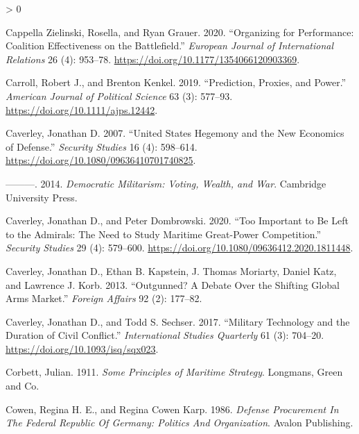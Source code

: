 \documentclass[
]{article}
\newlength{\cslhangindent}
\newenvironment{CSLReferences}[2] %
 {%
  \setlength{\parindent}{0pt}
  \ifodd #1 \everypar{\setlength{\hangindent}{\cslhangindent}}\ignorespaces\fi
  \ifnum #2 > 0
  \setlength{\parskip}{#2\baselineskip}
  \fi
 }%
 {}
\begin{document}
\begin{CSLReferences}{1}{0}
\leavevmode\hypertarget{ref-cappellazielinski_organizingperformancecoalition_2020}{}%
Cappella Zielinski, Rosella, and Ryan Grauer. 2020. {``Organizing for Performance: Coalition Effectiveness on the Battlefield.''} \emph{European Journal of International Relations} 26 (4): 953--78. \url{https://doi.org/10.1177/1354066120903369}.

\leavevmode\hypertarget{ref-carroll_predictionproxiespower_2019}{}%
Carroll, Robert J., and Brenton Kenkel. 2019. {``Prediction, {Proxies}, and {Power}.''} \emph{American Journal of Political Science} 63 (3): 577--93. \url{https://doi.org/10.1111/ajps.12442}.

\leavevmode\hypertarget{ref-caverley_unitedstateshegemony_2007}{}%
Caverley, Jonathan D. 2007. {``United {States Hegemony} and the {New Economics} of {Defense}.''} \emph{Security Studies} 16 (4): 598--614. \url{https://doi.org/10.1080/09636410701740825}.

\leavevmode\hypertarget{ref-caverley_democraticmilitarismvoting_2014}{}%
---------. 2014. \emph{Democratic {Militarism}: {Voting}, {Wealth}, and {War}}. {Cambridge University Press}.

\leavevmode\hypertarget{ref-caverley_tooimportantbe_2020}{}%
Caverley, Jonathan D., and Peter Dombrowski. 2020. {``Too {Important} to {Be Left} to the {Admirals}: {The Need} to {Study Maritime Great-Power Competition}.''} \emph{Security Studies} 29 (4): 579--600. \url{https://doi.org/10.1080/09636412.2020.1811448}.

\leavevmode\hypertarget{ref-caverley_outgunneddebateshifting_2013}{}%
Caverley, Jonathan D., Ethan B. Kapstein, J. Thomas Moriarty, Daniel Katz, and Lawrence J. Korb. 2013. {``Outgunned? {A Debate Over} the {Shifting Global Arms Market}.''} \emph{Foreign Affairs} 92 (2): 177--82.

\leavevmode\hypertarget{ref-caverley_militarytechnologyduration_2017}{}%
Caverley, Jonathan D., and Todd S. Sechser. 2017. {``Military {Technology} and the {Duration} of {Civil Conflict}.''} \emph{International Studies Quarterly} 61 (3): 704--20. \url{https://doi.org/10.1093/isq/sqx023}.

\leavevmode\hypertarget{ref-corbett_principlesmaritimestrategy_1911}{}%
Corbett, Julian. 1911. \emph{Some {Principles} of {Maritime Strategy}}. {Longmans, Green and Co.}

\leavevmode\hypertarget{ref-cowen_defenseprocurementfederal_1986}{}%
Cowen, Regina H. E., and Regina Cowen Karp. 1986. \emph{Defense {Procurement In The Federal Republic Of Germany}: {Politics And Organization}}. {Avalon Publishing}.


\end{CSLReferences}
\end{document}

